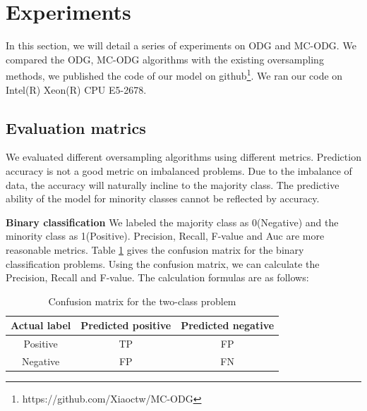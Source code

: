 \documentclass[ida]{iosart2x}
\begin{document}
\section{Experiments}

In this section, we will detail a series of experiments on ODG and MC-ODG.
We compared the ODG, MC-ODG algorithms with the existing oversampling methods,
we published the code of our model on github\footnote{https://github.com/Xiaoctw/MC-ODG}.
We ran our code on Intel(R) Xeon(R) CPU E5-2678.
\subsection{Evaluation matrics}

We evaluated different oversampling algorithms using different metrics. 
Prediction accuracy is not a good metric on imbalanced problems.
Due to the imbalance of data, the accuracy will naturally incline to the majority class.
The predictive ability of the model for minority classes cannot be reflected by accuracy.

\textbf{Binary classification} We labeled the majority class as 0(Negative) and the minority class as 1(Positive).
Precision, Recall, F-value and Auc are more reasonable metrics.
Table \ref{table1} gives the confusion matrix for the binary classification problems.
Using the confusion matrix, 
  we can calculate the Precision, Recall and F-value. The calculation formulas are as follows:

\begin{table}[tb]
  \caption{Confusion matrix for the two-class problem}
  \label{table1}
  \centering
  \begin{tabular}{@{}ccc@{}}
  \toprule
  Actual label & \multicolumn{1}{l}{Predicted positive} & \multicolumn{1}{l}{Predicted negative} \\ \midrule
  Positive     & TP                                     & FP                                     \\
  Negative     & FP                                     & FN                                     \\ \bottomrule
  \end{tabular}
\end{table}
\end{document}
